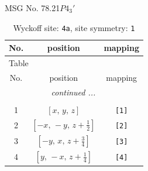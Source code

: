 \documentclass[fleqn,8pt]{jsarticle}
\begin{document}
\setcounter{MaxMatrixCols}{32}

\renewcommand{\tablename}{Table~}
\renewcommand{\figurename}{Figure~}
\begin{center}
\LARGE
MSG No. 78.21\quad$P4_{3}'$
\end{center}
\renewcommand{\arraystretch}{1.2}
\begin{longtable}{ccc}
\caption{Wyckoff site: {\tt 4a}, site symmetry: {\tt 1}}
 \\
 \hline \hline
No. & position & mapping \\ \hline \endfirsthead

\multicolumn{2}{l}{\tablename\ \thetable{}} \\
 \hline \hline
No. & position & mapping \\ \hline \endhead

 \hline \hline
\multicolumn{2}{r}{\footnotesize\it continued ...} \\ \endfoot

 \hline \hline
\multicolumn{2}{r}{} \\ \endlastfoot

1 & $\left[ x,\, y,\, z \right]$ & {\tt [1]} \\ \hline
2 & $\left[ - x,\, - y,\, z + \frac{1}{2} \right]$ & {\tt [2]} \\ \hline
3 & $\left[ - y,\, x,\, z + \frac{3}{4} \right]$ & {\tt [3]} \\ \hline
4 & $\left[ y,\, - x,\, z + \frac{1}{4} \right]$ & {\tt [4]} \\
\end{longtable}
\end{document}
